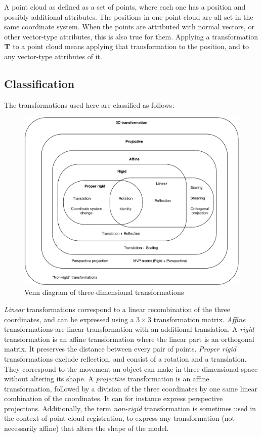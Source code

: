A point cloud as defined as a set of points, where each one has a position and possibly additional attributes. The positions in one point cloud are all set in the same coordinate system. When the points are attributed with normal vectors, or other vector-type attributes, this is also true for them. Applying a transformation $\mathbf{T}$ to a point cloud means applying that transformation to the position, and to any vector-type attributes of it.

\subsection{Classification}
The transformations used here are classified as follows:

\begin{figure}[h]
\center
\includegraphics[width=.8\textwidth]{fig/transformations_venn.pdf}
\caption{Venn diagram of three-dimensional transformations}
\end{figure}

\emph{Linear} transformations correspond to a linear recombination of the three coordinates, and can be expressed using a $3 \times 3$ transformation matrix. \emph{Affine} transformations are linear transformation with an additional translation. A \emph{rigid} transformation is an affine transformation where the linear part is an orthogonal matrix. It preserves the distance between every pair of points. \emph{Proper rigid} transformations exclude reflection, and consist of a rotation and a translation. They correspond to the movement an object can make in three-dimensional space without altering its shape. A \emph{projective} transformation is an affine transformation, followed by a division of the three coordinates by one same linear combination of the coordinates. It can for instance express perspective projections. Additionally, the term \emph{non-rigid} transformation is sometimes used in the context of point cloud registration, to express any transformation (not necessarily affine) that alters the shape of the model.

